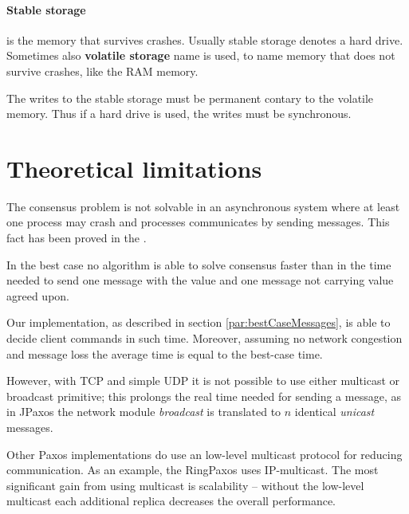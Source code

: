 \paragraph{Stable storage}
is the memory that survives crashes. Usually stable storage denotes a hard drive.
Sometimes also \textbf{volatile storage} name is used, to name memory that does not survive crashes, like the RAM memory.

\noindent The writes to the stable storage must be permanent contary to the volatile memory. Thus if a hard drive is used, the writes must be synchronous.

\section{Theoretical limitations}


The consensus problem is not solvable in an asynchronous system where at least one process may crash and processes communicates by sending messages. This fact has been proved in the \cite{FLP}.


In the best case no algorithm is able to solve consensus faster than in the time needed to send one message with the value and one message not carrying value agreed upon.

Our implementation, as described in section \ref{par:bestCaseMessages}, is able to decide client commands in such time. Moreover, assuming no network congestion and message loss the average time is equal to the best-case time.

However, with TCP and simple UDP it is not possible to use either multicast or broadcast primitive; this prolongs the real time needed for sending a message, as in JPaxos the network module \emph{broadcast} is translated to $n$ identical \textit{unicast} messages.

Other Paxos implementations do use an low-level multicast protocol for reducing communication. As an example, the RingPaxos \cite{Mar10} uses IP-multicast. The most significant gain from using multicast is scalability -- without the low-level multicast each additional replica decreases the overall performance.

